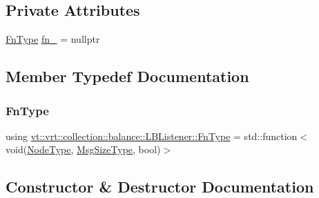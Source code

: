 \subsection*{Private Attributes}
\begin{DoxyCompactItemize}
\item 
\hyperlink{structvt_1_1vrt_1_1collection_1_1balance_1_1_l_b_listener_af3b881f723f2d7850f6941261449e4d9}{Fn\+Type} \hyperlink{structvt_1_1vrt_1_1collection_1_1balance_1_1_l_b_listener_a71e01f997215a3b8c5eb659a1921b6f7}{fn\+\_\+} = nullptr
\end{DoxyCompactItemize}


\subsection{Member Typedef Documentation}
\mbox{\label{structvt_1_1vrt_1_1collection_1_1balance_1_1_l_b_listener_af3b881f723f2d7850f6941261449e4d9}} 
\subsubsection{\texorpdfstring{Fn\+Type}{FnType}}
{\footnotesize\ttfamily using \hyperlink{structvt_1_1vrt_1_1collection_1_1balance_1_1_l_b_listener_af3b881f723f2d7850f6941261449e4d9}{vt\+::vrt\+::collection\+::balance\+::\+L\+B\+Listener\+::\+Fn\+Type} =  std\+::function$<$void(\hyperlink{namespacevt_a866da9d0efc19c0a1ce79e9e492f47e2}{Node\+Type}, \hyperlink{namespacevt_abfa009d900299ac1df967b40ea8f2c8a}{Msg\+Size\+Type}, bool)$>$}



\subsection{Constructor \& Destructor Documentation}
\mbox{\label{structvt_1_1vrt_1_1collection_1_1balance_1_1_l_b_listener_a61850d168d76a305261cf244d69b3237}} 
